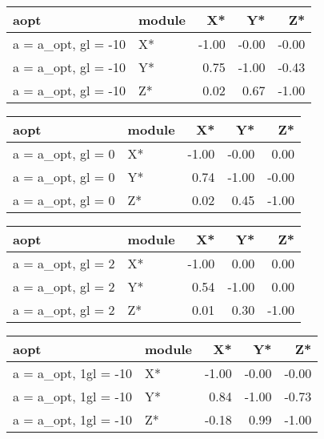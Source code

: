 \documentclass[10pt,a4paper]{article}
\begin{document}
\begin{table}[ht]
\centering
\begin{tabular}{llrrr}
  \hline
aopt & module & X* & Y* & Z* \\ 
  \hline
a = a\_opt, gl = -10 & X* & -1.00 & -0.00 & -0.00 \\ 
  a = a\_opt, gl = -10 & Y* & 0.75 & -1.00 & -0.43 \\ 
  a = a\_opt, gl = -10 & Z* & 0.02 & 0.67 & -1.00 \\ 
   \hline
\end{tabular}
\end{table}


\begin{table}[ht]
\centering
\begin{tabular}{llrrr}
  \hline
aopt & module & X* & Y* & Z* \\ 
  \hline
a = a\_opt, gl = 0 & X* & -1.00 & -0.00 & 0.00 \\ 
  a = a\_opt, gl = 0 & Y* & 0.74 & -1.00 & -0.00 \\ 
  a = a\_opt, gl = 0 & Z* & 0.02 & 0.45 & -1.00 \\ 
   \hline
\end{tabular}
\end{table}


\begin{table}[ht]
\centering
\begin{tabular}{llrrr}
  \hline
aopt & module & X* & Y* & Z* \\ 
  \hline
a = a\_opt, gl = 2 & X* & -1.00 & 0.00 & 0.00 \\ 
  a = a\_opt, gl = 2 & Y* & 0.54 & -1.00 & 0.00 \\ 
  a = a\_opt, gl = 2 & Z* & 0.01 & 0.30 & -1.00 \\ 
   \hline
\end{tabular}
\end{table}


\begin{table}[ht]
\centering
\begin{tabular}{llrrr}
  \hline
aopt & module & X* & Y* & Z* \\ 
  \hline
a = a\_opt, 1gl = -10 & X* & -1.00 & -0.00 & -0.00 \\ 
  a = a\_opt, 1gl = -10 & Y* & 0.84 & -1.00 & -0.73 \\ 
  a = a\_opt, 1gl = -10 & Z* & -0.18 & 0.99 & -1.00 \\ 
   \hline
\end{tabular}
\end{table}
\end{document}

